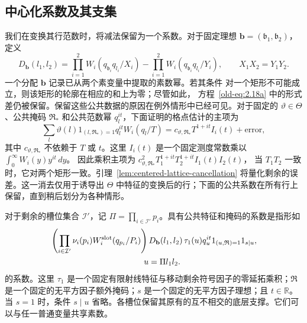\documentclass[11pt,a4paper]{article}
\numberwithin{equation}{section}
\numberwithin{figure}{section}
\theoremstyle{definition}
\theoremstyle{remark}
\begin{document}
\subsection{中心化系数及其支集}

我们在变换其行范数时，将减法保留为一个系数。对于固定理想
\(\mathbf b=(\mathfrak b_1,\mathfrak b_2)\)，定义
\begin{equation}
 D_{\mathbf b}(l_1,l_2)
 =
 \prod_{i=1}^2W_i(q_{\mathfrak b_i}q_{l_i}/X_i)
 -
 \prod_{i=1}^2W_i(q_{\mathfrak b_i}q_{l_i}/Y_i),
 \qquad X_1X_2=Y_1Y_2.
 \label{old-eq:2.18a}
\end{equation}
一个分配 \(\mathbf b\) 记录已从两个素变量中提取的素数幂。若其条件
对一个矩形不可能成立，则该矩形的轮廓在相应的和上为零；尽管如此，
方程~\eqref{old-eq:2.18a} 中的形式差仍被保留。保留这些公共数据的原因在例外情形中已经可见。对于固定的 \(\vartheta\in\Theta\)、公共掩码 \(\mathfrak R_*\) 和公共范数幂 \(q_l^{it}\)，下面证明的格点估计的主项为
\[
 \sum_l\vartheta(l)1_{(l,\mathfrak R_*)=1}q_l^{it}W_i(q_l/T)
 =c_{\vartheta,\mathfrak R_*}T^{1+it}I_i(t)+\text{error},
\]
其中 \(c_{\vartheta,\mathfrak R_*}\) 不依赖于 \(T\) 或 \(t\)。这里 \(I_i(t)\) 是一个固定测度常数乘以
\(\int_0^\infty W_i(y)y^{it}\,dy\)。
因此乘积主项为
\(c_{\vartheta,\mathfrak R_*}^2T_1^{1+it}T_2^{1+it}I_1(t)I_2(t)\)，
当 \(T_1T_2\) 一致时，它对两个矩形一致。引理~\ref{lem:centered-lattice-cancellation} 将量化剩余的误差。这一消去仅用于诱导出 \(\Theta\) 中特征的变换后的行；下面的公共系数在所有行上保留，直到稍后划分为各种情形。

对于剩余的槽位集合 \(\mathcal I'\)，记
\(\Pi=\prod_{i\in\mathcal I'}p_i\)。具有公共特征和掩码的系数是指形如
\begin{equation}
 \begin{split}
 &\left(\prod_{i\in\mathcal I'}
       \nu_i(p_i)W_i^{\rm slot}(q_{p_i}/P_i)\right)
 D_{\mathbf b}(l_1,l_2)\,
 \tau_1(u)q_u^{it}
 1_{(u,\mathfrak R)=1}1_{s\mid u},\\
 &\hspace{40mm}u=\Pi l_1l_2.
 \end{split}
 \label{eq:centered-coefficient-form}
\end{equation}
的系数。这里 \(\tau_1\) 是一个固定有限射线特征与移动剩余符号因子的零延拓乘积；\(\mathfrak R\) 是一个固定的无平方因子额外掩码；\(s\) 是一个固定的无平方因子理想；且
\(t\in\mathbb R\)。当
\(s=1\) 时，条件 \(s\mid u\) 省略。各槽位保留其原有的互不相交的底层支撑。它们可以与任一普通变量共享素数。
\end{document}

